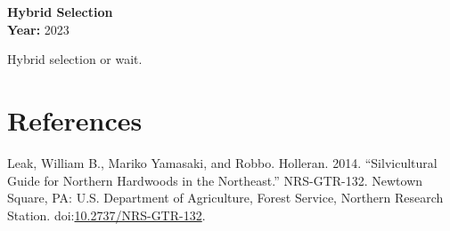 \documentclass[]{tufte-handout}
\begin{document}
\textbf{Hybrid Selection}\\
\noindent \textbf{Year:} 2023

Hybrid selection or wait.

\newpage

\section*{References}\label{references}

\hypertarget{refs}{}
\hypertarget{ref-leak_silvicultural_2014}{}
Leak, William B., Mariko Yamasaki, and Robbo. Holleran. 2014.
``Silvicultural Guide for Northern Hardwoods in the Northeast.''
NRS-GTR-132. Newtown Square, PA: U.S. Department of Agriculture, Forest
Service, Northern Research Station.
doi:\href{https://doi.org/10.2737/NRS-GTR-132}{10.2737/NRS-GTR-132}.
\end{document}
